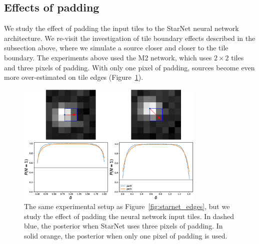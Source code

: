 \subsection{Effects of padding}
We study the effect of padding the input 
tiles to the StarNet neural network architecture. 
We re-visit the investigation of tile boundary effects 
described in the subsection above, where 
we simulate a source closer and closer to the tile boundary. 
The experiments above used the M2 network, 
which uses $2\times 2$ tiles and three pixels of padding. 
With only one pixel of padding, sources become even more 
over-estimated on tile edges (Figure~\ref{fig:starnet_edges_lesspad}). 

\begin{figure}[tb]
    \centering
    \includegraphics[width=0.8\textwidth]{./figures_vg/coverage/edges_example_lesspad.eps}
    \caption{The same experimental setup as Figure~\ref{fig:starnet_edges}, but we 
    study the effect of padding the neural network input tiles. 
    In dashed blue, the posterior when 
    StarNet uses three pixels of padding. 
    In solid orange, the posterior when only one pixel of padding is used.
    }
    \label{fig:starnet_edges_lesspad}
\end{figure}
